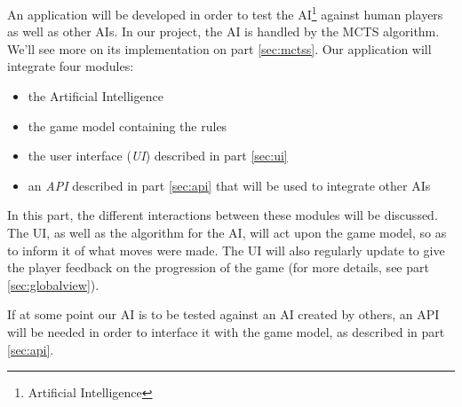 An application will be developed in order to test the AI\footnote{Artificial Intelligence} against human players as well as other AIs.
In our project, the AI is handled by the MCTS algorithm. We'll see more on its implementation on part \ref{sec:mctss}.
Our application will integrate four modules: 
\begin{itemize}
\item the Artificial Intelligence
\item the game model containing the rules
\item the user interface (\emph{UI}) described in part \ref{sec:ui}
\item an \emph{API} described in part \ref{sec:api} that will be used to integrate other AIs
\end{itemize}

In this part, the different interactions between these modules will be discussed.
The UI, as well as the algorithm for the AI, will act upon the game model, so as to inform it of what moves were made.
The UI will also regularly update to give the player feedback on the progression of the game (for more details, see part \ref{sec:globalview}).

If at some point our AI is to be tested against an AI created by others, an API will be needed in order to interface it with the game model, as described in part \ref{sec:api}.

